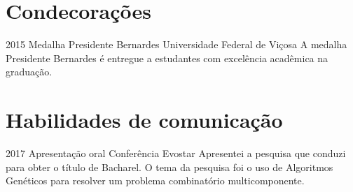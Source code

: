 \documentclass[a4paper]{cv-friggeri-x}
\begin{document}
\section{Condecorações}

\begin{entrylist}


\entry
    {2015}
    {Medalha Presidente Bernardes}
    {Universidade Federal de Vi\c cosa}
    {A medalha Presidente Bernardes é entregue a estudantes com excelência acadêmica na graduação.}


\end{entrylist}


\section{Habilidades de comunicação}

\begin{entrylist}


\entry
{2017}
{Apresentação oral}
{Conferência Evostar}
{Apresentei a pesquisa que conduzi para obter o título de Bacharel. O tema da pesquisa foi o uso de Algoritmos Genéticos para resolver um problema combinatório multicomponente.}


\end{entrylist}



\end{document}
